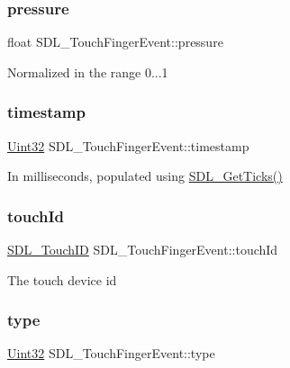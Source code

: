 \subsubsection{\texorpdfstring{pressure}{pressure}}
{\footnotesize\ttfamily float S\+D\+L\+\_\+\+Touch\+Finger\+Event\+::pressure}

Normalized in the range 0...1 \mbox{\label{struct_s_d_l___touch_finger_event_abde2ab5cb013bbd21e37a65e2f8fa666}} 
\subsubsection{\texorpdfstring{timestamp}{timestamp}}
{\footnotesize\ttfamily \mbox{\hyperlink{_s_d_l__stdinc_8h_add440eff171ea5f55cb00c4a9ab8672d}{Uint32}} S\+D\+L\+\_\+\+Touch\+Finger\+Event\+::timestamp}

In milliseconds, populated using \mbox{\hyperlink{_s_d_l__timer_8h_a0b9bc71d6287e0ffafdc3419760fe2b3}{S\+D\+L\+\_\+\+Get\+Ticks()}} \mbox{\label{struct_s_d_l___touch_finger_event_ad7a6f39ec9af1bf47b160d18314edd70}} 
\subsubsection{\texorpdfstring{touchId}{touchId}}
{\footnotesize\ttfamily \mbox{\hyperlink{_s_d_l__touch_8h_a10f5f86abe4ea8308a8706bd5d3b337a}{S\+D\+L\+\_\+\+Touch\+ID}} S\+D\+L\+\_\+\+Touch\+Finger\+Event\+::touch\+Id}

The touch device id \mbox{\label{struct_s_d_l___touch_finger_event_a3883218fa3426065ca66086c100edbfa}} 
\subsubsection{\texorpdfstring{type}{type}}
{\footnotesize\ttfamily \mbox{\hyperlink{_s_d_l__stdinc_8h_add440eff171ea5f55cb00c4a9ab8672d}{Uint32}} S\+D\+L\+\_\+\+Touch\+Finger\+Event\+::type}

